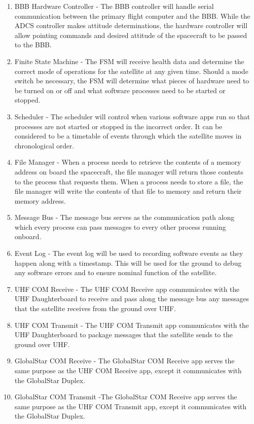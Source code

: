\documentclass{article}
\begin{document}
\begin{enumerate}
\item BBB Hardware Controller - The BBB controller will handle serial communication between the primary flight computer and the BBB. While the ADCS controller makes attitude determinations, the hardware controller will allow pointing commands and desired attitude of the spacecraft to be passed to the BBB.
\item Finite State Machine - The FSM will receive health data and determine the correct mode of operations for the satellite at any given time. Should a mode switch be necessary, the FSM will determine what pieces of hardware need to be turned on or off and what software processes need to be started or stopped.
\item Scheduler - The scheduler will control when various software apps run so that processes are not started or stopped in the incorrect order. It can be considered to be a timetable of events through which the satellite moves in chronological order.
\item File Manager - When a process needs to retrieve the contents of a memory address on board the spacecraft, the file manager will return those contents to the process that requests them. When a process needs to store a file, the file manager will write the contents of that file to memory and return their memory address.
\item Message Bus - The message bus serves as the communication path along which every process can pass messages to every other process running onboard.
\item Event Log - The event log will be used to recording software events as they happen along with a timestamp. This will be used for the ground to debug any software errors and to ensure nominal function of the satellite.
\item UHF COM Receive - The UHF COM Receive app communicates with the UHF Daughterboard to receive and pass along the message bus any messages that the satellite receives from the ground over UHF.
\item UHF COM Transmit - The UHF COM Transmit app communicates with the UHF Daughterboard to package messages that the satellite sends to the ground over UHF.
\item GlobalStar COM Receive - The GlobalStar COM Receive app serves the same purpose as the UHF COM Receive app, except it communicates with the GlobalStar Duplex.
\item GlobalStar COM Transmit -The GlobalStar COM Receive app serves the same purpose as the UHF COM Transmit app, except it communicates with the GlobalStar Duplex.
\end{enumerate}
\end{document}
